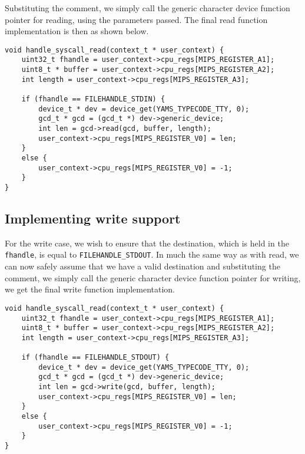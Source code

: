 \documentclass[11pt]{article}
\newcommand{\code}[1]{{\tt #1}}
\begin{document}
Substituting the comment, we simply call the generic character device function
pointer for reading, using the parameters passed. The final read function
implementation is then as shown below.

\begin{lstlisting}
void handle_syscall_read(context_t * user_context) {
    uint32_t fhandle = user_context->cpu_regs[MIPS_REGISTER_A1];
    uint8_t * buffer = user_context->cpu_regs[MIPS_REGISTER_A2];
    int length = user_context->cpu_regs[MIPS_REGISTER_A3];

    if (fhandle == FILEHANDLE_STDIN) {
        device_t * dev = device_get(YAMS_TYPECODE_TTY, 0);
        gcd_t * gcd = (gcd_t *) dev->generic_device;
        int len = gcd->read(gcd, buffer, length);
        user_context->cpu_regs[MIPS_REGISTER_V0] = len;
    }
    else {
        user_context->cpu_regs[MIPS_REGISTER_V0] = -1;
    }
}
\end{lstlisting}

\subsection{Implementing write support}
For the write case, we wish to ensure that the destination, which is held in
the \code{fhandle}, is equal to \code{FILEHANDLE\_STDOUT}. In much the same
way as with read, we can now safely assume that we have a valid destination
and substituting the comment, we simply call the generic character device
function pointer for writing, we get the final write function implementation.

\begin{lstlisting}
void handle_syscall_read(context_t * user_context) {
    uint32_t fhandle = user_context->cpu_regs[MIPS_REGISTER_A1];
    uint8_t * buffer = user_context->cpu_regs[MIPS_REGISTER_A2];
    int length = user_context->cpu_regs[MIPS_REGISTER_A3];

    if (fhandle == FILEHANDLE_STDOUT) {
        device_t * dev = device_get(YAMS_TYPECODE_TTY, 0);
        gcd_t * gcd = (gcd_t *) dev->generic_device;
        int len = gcd->write(gcd, buffer, length);
        user_context->cpu_regs[MIPS_REGISTER_V0] = len;
    }
    else {
        user_context->cpu_regs[MIPS_REGISTER_V0] = -1;
    }
}
\end{lstlisting}
\end{document}
